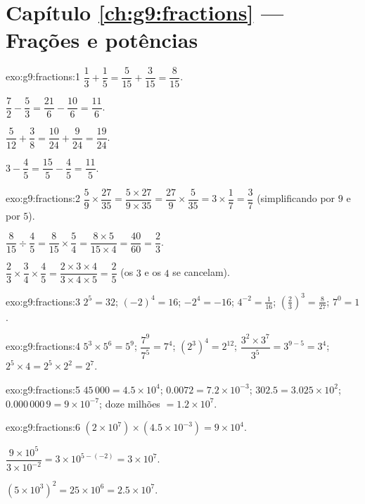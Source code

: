 \section*{Capítulo \ref{ch:g9:fractions} --- Frações e potências}

\begin{solution}{exo:g9:fractions:1}
$\dfrac13 + \dfrac15 = \dfrac{5}{15} + \dfrac{3}{15} = \dfrac{8}{15}$.

$\dfrac72 - \dfrac53 = \dfrac{21}{6} - \dfrac{10}{6} = \dfrac{11}{6}$.

$\dfrac{5}{12} + \dfrac38 = \dfrac{10}{24} + \dfrac{9}{24} =
\dfrac{19}{24}$.

$3 - \dfrac45 = \dfrac{15}{5} - \dfrac45 = \dfrac{11}{5}$.
\end{solution}

\begin{solution}{exo:g9:fractions:2}
$\dfrac59 \times \dfrac{27}{35} = \dfrac{5 \times 27}{9 \times 35}
= \dfrac{27}{9} \times \dfrac{5}{35} = 3 \times \dfrac17 = \dfrac37$
(simplificando por $9$ e por $5$).

$\dfrac{8}{15} \div \dfrac45 = \dfrac{8}{15} \times \dfrac54
= \dfrac{8 \times 5}{15 \times 4} = \dfrac{40}{60} = \dfrac23$.

$\dfrac23 \times \dfrac34 \times \dfrac45 = \dfrac{2 \times 3 \times 4}
{3 \times 4 \times 5} = \dfrac25$ (os $3$ e os $4$ se cancelam).
\end{solution}

\begin{solution}{exo:g9:fractions:3}
$2^5 = 32$; \quad $(-2)^4 = 16$; \quad $-2^4 = -16$; \quad
$4^{-2} = \frac{1}{16}$; \quad
$\left(\frac23\right)^3 = \frac{8}{27}$; \quad $7^0 = 1$.
\end{solution}

\begin{solution}{exo:g9:fractions:4}
$5^3 \times 5^6 = 5^9$; \quad $\dfrac{7^9}{7^5} = 7^4$; \quad
$\left(2^3\right)^4 = 2^{12}$; \quad
$\dfrac{3^2 \times 3^7}{3^5} = 3^{9-5} = 3^4$; \quad
$2^5 \times 4 = 2^5 \times 2^2 = 2^7$.
\end{solution}

\begin{solution}{exo:g9:fractions:5}
$45\,000 = 4.5 \times 10^4$; \quad
$0.0072 = 7.2 \times 10^{-3}$; \quad
$302.5 = 3.025 \times 10^2$; \quad
$0.000\,000\,9 = 9 \times 10^{-7}$; \quad
doze milhões $= 1.2 \times 10^7$.
\end{solution}

\begin{solution}{exo:g9:fractions:6}
$(2 \times 10^7) \times (4.5 \times 10^{-3}) = 9 \times 10^{4}$.

$\dfrac{9 \times 10^5}{3 \times 10^{-2}} = 3 \times 10^{5 - (-2)}
= 3 \times 10^7$.

$(5 \times 10^3)^2 = 25 \times 10^6 = 2.5 \times 10^7$.
\end{solution}

